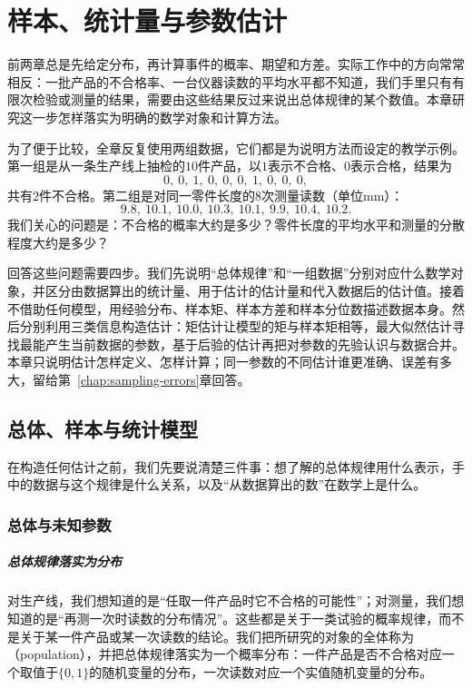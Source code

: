 \chapter{样本、统计量与参数估计}
\label{chap:sample-estimation}

前两章总是先给定分布，再计算事件的概率、期望和方差。实际工作中的方向常常相反：一批产品的不合格率、一台仪器读数的平均水平都不知道，我们手里只有有限次检验或测量的结果，需要由这些结果反过来说出总体规律的某个数值。本章研究这一步怎样落实为明确的数学对象和计算方法。

为了便于比较，全章反复使用两组数据，它们都是为说明方法而设定的教学示例。第一组是从一条生产线上抽检的$10$件产品，以$1$表示不合格、$0$表示合格，结果为
\[
0,\ 0,\ 1,\ 0,\ 0,\ 0,\ 1,\ 0,\ 0,\ 0,
\]
共有$2$件不合格。第二组是对同一零件长度的$8$次测量读数（单位mm）：
\[
9.8,\ 10.1,\ 10.0,\ 10.3,\ 10.1,\ 9.9,\ 10.4,\ 10.2 .
\]
我们关心的问题是：不合格的概率大约是多少？零件长度的平均水平和测量的分散程度大约是多少？

回答这些问题需要四步。我们先说明“总体规律”和“一组数据”分别对应什么数学对象，并区分由数据算出的统计量、用于估计的估计量和代入数据后的估计值。接着不借助任何模型，用经验分布、样本矩、样本方差和样本分位数描述数据本身。然后分别利用三类信息构造估计：矩估计让模型的矩与样本矩相等，最大似然估计寻找最能产生当前数据的参数，基于后验的估计再把对参数的先验认识与数据合并。本章只说明估计怎样定义、怎样计算；同一参数的不同估计谁更准确、误差有多大，留给第~\ref{chap:sampling-errors}章回答。

\section{总体、样本与统计模型}
\label{sec:est-samples}

在构造任何估计之前，我们先要说清楚三件事：想了解的总体规律用什么表示，手中的数据与这个规律是什么关系，以及“从数据算出的数”在数学上是什么。

\subsection{总体与未知参数}

\paragraph{总体规律落实为分布}
对生产线，我们想知道的是“任取一件产品时它不合格的可能性”；对测量，我们想知道的是“再测一次时读数的分布情况”。这些都是关于一类试验的概率规律，而不是关于某一件产品或某一次读数的结论。我们把所研究的对象的全体称为（population），并把总体规律落实为一个概率分布：一件产品是否不合格对应一个取值于$\{0,1\}$的随机变量的分布，一次读数对应一个实值随机变量的分布。

